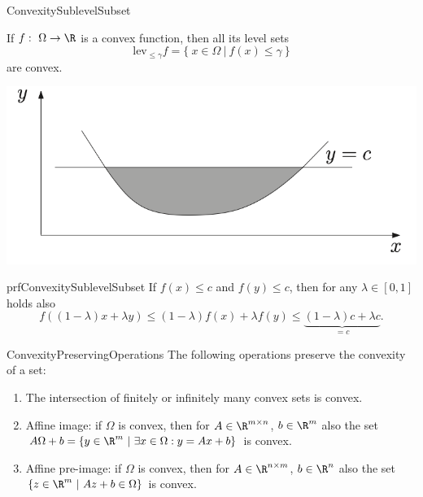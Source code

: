 
\begin{theo}{ConvexitySublevelSubset}
    \vspace*{-0.7cm}
    \begin{minipage}{0.56\textwidth}
        If $f: \ \Omega \rightarrow \R$ is a convex function, then all its level sets 
        \begin{equation*}
            \text{lev}_{\leq \gamma}f = \{ \ x \in \Omega \ | \ f(x) \leq \gamma \ \}
        \end{equation*}
        are convex.
    \end{minipage}
    \begin{minipage}{0.42\textwidth}
        \begin{center}
            \vspace*{0.2cm}
            \includegraphics[scale = 0.495]{Images/Fundamental/ConvexSubset.png}
        \end{center}
    \end{minipage}
    \vspace{-0.3cm}
\end{theo}

\begin{prf}{prfConvexitySublevelSubset}
    If $f(x) \leq c$ and $f(y) \leq c$, then for any $\lambda \in [0,1]$ holds also 
    \begin{equation*}
        f((1-\lambda)x + \lambda y) \leq (1-\lambda)f(x) + \lambda f(y) \leq \underset{= c}{\underbrace{(1-\lambda)c + \lambda c}}.
    \end{equation*}
    \vspace*{-0.7cm}
\end{prf}

\begin{pro}{ConvexityPreservingOperations}
    The following operations preserve the convexity of a set:
    \begin{enumerate}
        \item The intersection of finitely or infinitely many convex sets is convex.
        \item Affine image: if $\Omega$ is convex, then for $A \in \R^{m \times n}$, $b \in \R^m$ also the set $A\Omega + b = \{ y \in \R^m \ | \ \exists x \in \Omega : y = Ax + b \}$ is convex.
        \item Affine pre-image: if $\Omega$ is convex, then for $A \in \R^{n \times m}$, $b \in \R^n$ also the set $\{ z \in \R^m \ | \ Az + b \in \Omega \}$ is convex.
    \end{enumerate}
\end{pro}

